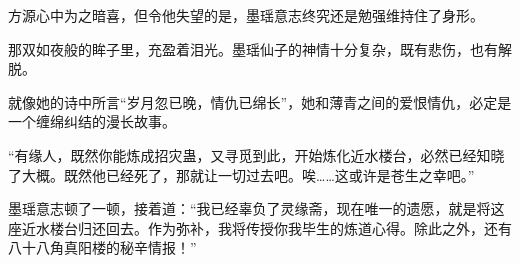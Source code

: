 \begin{this_body}
方源心中为之暗喜，但令他失望的是，墨瑶意志终究还是勉强维持住了身形。

那双如夜般的眸子里，充盈着泪光。墨瑶仙子的神情十分复杂，既有悲伤，也有解脱。

就像她的诗中所言“岁月忽已晚，情仇已绵长”，她和薄青之间的爱恨情仇，必定是一个缠绵纠结的漫长故事。

“有缘人，既然你能炼成招灾蛊，又寻觅到此，开始炼化近水楼台，必然已经知晓了大概。既然他已经死了，那就让一切过去吧。唉……这或许是苍生之幸吧。”

墨瑶意志顿了一顿，接着道：“我已经辜负了灵缘斋，现在唯一的遗愿，就是将这座近水楼台归还回去。作为弥补，我将传授你我毕生的炼道心得。除此之外，还有八十八角真阳楼的秘辛情报！”

\end{this_body}

